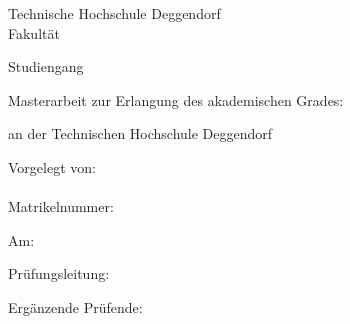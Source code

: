 \begin{titlepage}
\begin{center}
	{
	Technische Hochschule Deggendorf\\
	Fakultät \faculty\par}
	\vspace{.2cm}
{\Large Studiengang \studies\\}
\vspace{6\baselineskip}
{\Huge{}\thesistitleDE\par}
\vspace{1cm}
{\Huge{}\thesistitleEN\par}
\vspace{6\baselineskip}

Masterarbeit zur Erlangung des akademischen Grades:

	\vspace{.2cm}
	\emph{\degree}
	\vspace{.2cm}

an der Technischen Hochschule Deggendorf\\
\end{center}
\vfill
\parbox[t]{.4\textwidth}{
	Vorgelegt von:\\
	\student\\
	Matrikelnummer: \matrnr\par
	\vspace{\baselineskip}
	Am: \submissiondate\par
}
\hfill
\parbox[t]{.4\textwidth}{
Prüfungsleitung:\\
\supervisor%

\ifthenelse{\equal{\secsupervisor}{}}{}
{%
\vspace{\baselineskip}
Ergänzende Prüfende:\\
\secsupervisor%
}}
\end{titlepage}
\cleardoublepage\par
